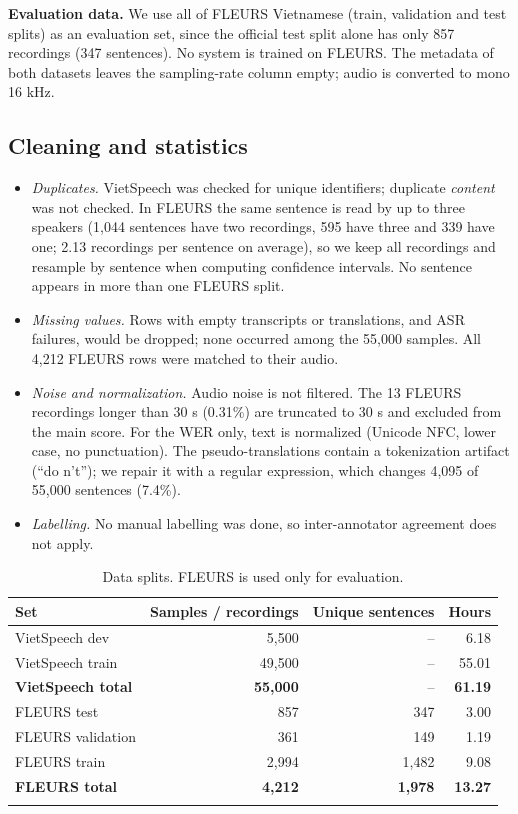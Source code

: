 \documentclass[pdflatex,sn-mathphys-num]{sn-jnl}
\begin{document}
\textbf{Evaluation data.} We use all of FLEURS Vietnamese (train, validation and test splits) as an evaluation set, since the official test split alone has only 857 recordings (347 sentences). No system is trained on FLEURS. The metadata of both datasets leaves the sampling-rate column empty; audio is converted to mono 16 kHz.

\subsection{Cleaning and statistics}

\begin{itemize}
\item \emph{Duplicates.} VietSpeech was checked for unique identifiers; duplicate \emph{content} was not checked. In FLEURS the same sentence is read by up to three speakers (1,044 sentences have two recordings, 595 have three and 339 have one; 2.13 recordings per sentence on average), so we keep all recordings and resample by sentence when computing confidence intervals. No sentence appears in more than one FLEURS split.
\item \emph{Missing values.} Rows with empty transcripts or translations, and ASR failures, would be dropped; none occurred among the 55,000 samples. All 4,212 FLEURS rows were matched to their audio.
\item \emph{Noise and normalization.} Audio noise is not filtered. The 13 FLEURS recordings longer than 30 s (0.31\%) are truncated to 30 s and excluded from the main score. For the WER only, text is normalized (Unicode NFC, lower case, no punctuation). The pseudo-translations contain a tokenization artifact (``do n't''); we repair it with a regular expression, which changes 4,095 of 55,000 sentences (7.4\%).
\item \emph{Labelling.} No manual labelling was done, so inter-annotator agreement does not apply.
\end{itemize}

\begin{table}[t]
\caption{Data splits. FLEURS is used only for evaluation.}\label{tab:splits}
\begin{tabular}{@{}lrrr@{}}
\toprule
Set & Samples / recordings & Unique sentences & Hours\\
\midrule
VietSpeech dev & 5,500 & -- & 6.18\\
VietSpeech train & 49,500 & -- & 55.01\\
\textbf{VietSpeech total} & \textbf{55,000} & -- & \textbf{61.19}\\
\midrule
FLEURS test & 857 & 347 & 3.00\\
FLEURS validation & 361 & 149 & 1.19\\
FLEURS train & 2,994 & 1,482 & 9.08\\
\textbf{FLEURS total} & \textbf{4,212} & \textbf{1,978} & \textbf{13.27}\\
\botrule
\end{tabular}
\end{table}
\end{document}
